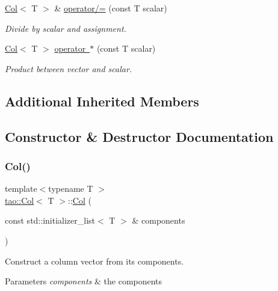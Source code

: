 \begin{DoxyCompactItemize}
\mbox{\hyperlink{classtao_1_1_col}{Col}}$<$ T $>$ \& \mbox{\hyperlink{classtao_1_1_col_abddd1e9737a0cafd50a52fd5063e4851}{operator/=}} (const T scalar)
\begin{DoxyCompactList}\small\item\em Divide by scalar and assignment. \end{DoxyCompactList}\item 
\mbox{\hyperlink{classtao_1_1_col}{Col}}$<$ T $>$ \mbox{\hyperlink{classtao_1_1_col_a734ed22497ede69a2ed0f791bd503355}{operator $\ast$}} (const T scalar)
\begin{DoxyCompactList}\small\item\em Product between vector and scalar. \end{DoxyCompactList}\end{DoxyCompactItemize}
\subsection*{Additional Inherited Members}


\subsection{Constructor \& Destructor Documentation}
\mbox{\label{classtao_1_1_col_a9133bec2b352e2e139e51e1f9107473d}} 
\subsubsection{\texorpdfstring{Col()}{Col()}}
{\footnotesize\ttfamily template$<$typename T $>$ \\
\mbox{\hyperlink{classtao_1_1_col}{tao\+::\+Col}}$<$ T $>$\+::\mbox{\hyperlink{classtao_1_1_col}{Col}} (\begin{DoxyParamCaption}\item[{const std\+::initializer\+\_\+list$<$ T $>$ \&}]{components }\end{DoxyParamCaption})}



Construct a column vector from its components. 


\begin{DoxyParams}{Parameters}
{\em components} & the components \\
\hline
\end{DoxyParams}


